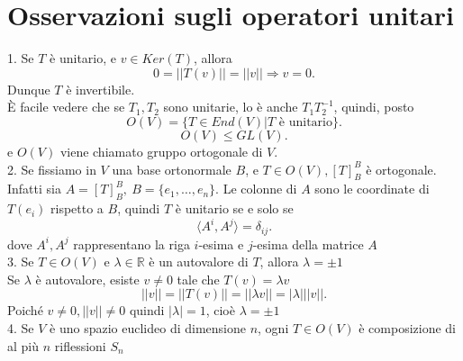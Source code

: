 \documentclass[12px]{article}
\begin{document}
\section{Osservazioni sugli operatori unitari}
1. Se $T$ è unitario, e $v\in Ker(T)$, allora
\[
 0 = ||T(v)|| = ||v|| \Rightarrow  v = 0
.\] 
Dunque $T$ è invertibile.\\
È facile vedere che se $T_1,T_2$ sono unitarie, lo è anche $T_1T_2^{-1}$, quindi, posto
\[
	O(V) = \{T\in End(V)| T \text{ è unitario}\}
.\] 
\[
O(V) \leq GL(V)
.\] 
e $O(V)$ viene chiamato gruppo ortogonale di $V$.\\[10px]
2. Se fissiamo in  $V$ una base ortonormale $B$, e $T\in O(V), [T]^B_B$ è ortogonale.\\
Infatti sia $A = [T]_B^B, \ B = \{e_1,\ldots,e_n\}$. Le colonne di $A$ sono le coordinate di $T(e_i)$ rispetto a $B$, quindi $T $ è unitario se e solo se
\[
	\langle A^i, A^j \rangle = \delta_{ij}
.\] 
dove $A^i, A^j$ rappresentano la riga $i$-esima e $j$-esima della matrice $A$\\[10px]
3. Se $T\in O(V)$ e $\lambda\in \mathbb{R}$ è un autovalore di $T$, allora $\lambda = \pm 1$ \\
Se $\lambda$ è autovalore, esiste $v\neq 0$ tale che $T(v) = \lambda v$ 
\[
||v|| = ||T(v)|| = ||\lambda v|| = |\lambda|||v||
.\] 
Poiché $v\neq 0, ||v|| \neq 0$ quindi $|\lambda| = 1$, cioè $\lambda = \pm 1$\\[10px]
4. Se $V$ è uno spazio euclideo di dimensione $n$, ogni $T\in O(V)$ è composizione di al più $n$ riflessioni $S_n$\\
\end{document}
